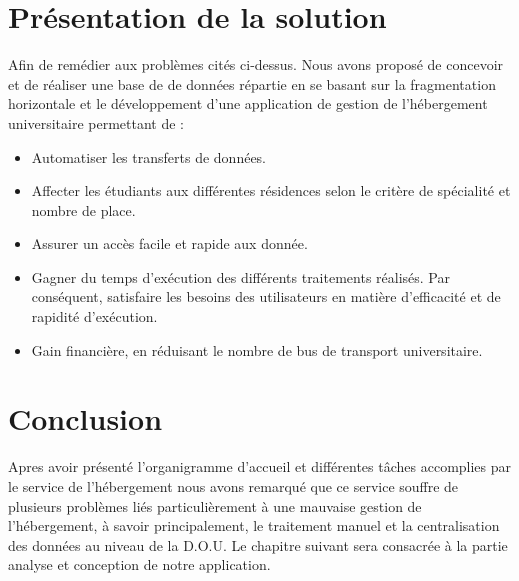 \section{Présentation de la solution}
    Afin de remédier aux problèmes cités ci-dessus. Nous avons proposé de concevoir et de réaliser une base de de données répartie en se basant sur la fragmentation horizontale et le développement d'une application de gestion de l'hébergement universitaire permettant de :
    \begin{itemize}
        \item Automatiser les transferts de données.
        \item Affecter les étudiants aux différentes résidences selon le critère de spécialité et nombre de place. 
        \item Assurer un accès facile et rapide aux donnée.
        \item Gagner du temps d'exécution des différents traitements réalisés. Par conséquent, 
        satisfaire les besoins des utilisateurs en matière d'efficacité et de rapidité d'exécution.
        \item Gain financière, en réduisant le nombre de bus de transport universitaire. 
    \end{itemize}

\section{Conclusion}
    Apres avoir présenté l’organigramme d’accueil et différentes tâches accomplies par le service de l'hébergement nous avons remarqué que ce service souffre de plusieurs problèmes liés particulièrement à une mauvaise gestion de l'hébergement, à savoir principalement, le traitement manuel et la centralisation des données au niveau de la D.O.U. Le chapitre suivant sera consacrée à la partie analyse et conception de notre application.



